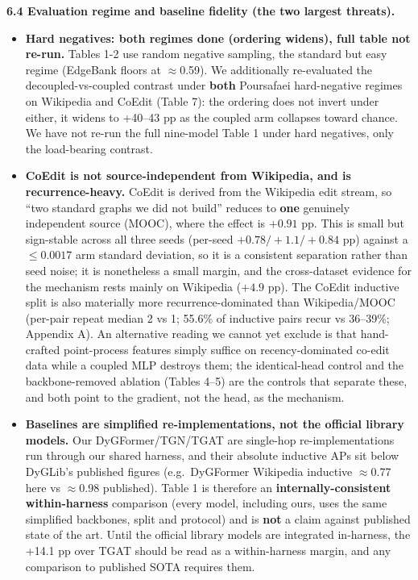 \documentclass[conference]{IEEEtran}
\begin{document}
\textbf{6.4 Evaluation regime and baseline fidelity (the two largest threats).}
\begin{itemize}
\item \textbf{Hard negatives: both regimes done (ordering widens), full table not re-run.} Tables 1-2 use random negative sampling, the standard but easy regime (EdgeBank floors at $\approx$0.59). We additionally re-evaluated the decoupled-vs-coupled contrast under \textbf{both} Poursafaei hard-negative regimes on Wikipedia and CoEdit (Table 7): the ordering does not invert under either, it widens to +40--43 pp as the coupled arm collapses toward chance. We have not re-run the full nine-model Table 1 under hard negatives, only the load-bearing contrast.
\item \textbf{CoEdit is not source-independent from Wikipedia, and is recurrence-heavy.} CoEdit is derived from the Wikipedia edit stream, so ``two standard graphs we did not build'' reduces to \textbf{one} genuinely independent source (MOOC), where the effect is $+0.91$ pp. This is small but sign-stable across all three seeds (per-seed $+0.78/+1.1/+0.84$ pp) against a $\le 0.0017$ arm standard deviation, so it is a consistent separation rather than seed noise; it is nonetheless a small margin, and the cross-dataset evidence for the mechanism rests mainly on Wikipedia ($+4.9$ pp). The CoEdit inductive split is also materially more recurrence-dominated than Wikipedia/MOOC (per-pair repeat median 2 vs 1; 55.6\% of inductive pairs recur vs 36--39\%; Appendix A). An alternative reading we cannot yet exclude is that hand-crafted point-process features simply suffice on recency-dominated co-edit data while a coupled MLP destroys them; the identical-head control and the backbone-removed ablation (Tables 4--5) are the controls that separate these, and both point to the gradient, not the head, as the mechanism.
\item \textbf{Baselines are simplified re-implementations, not the official library models.} Our DyGFormer/TGN/TGAT are single-hop re-implementations run through our shared harness, and their absolute inductive APs sit below DyGLib's published figures (e.g.~DyGFormer Wikipedia inductive $\approx$0.77 here vs $\approx$0.98 published). Table 1 is therefore an \textbf{internally-consistent within-harness} comparison (every model, including ours, uses the same simplified backbones, split and protocol) and is \textbf{not} a claim against published state of the art. Until the official library models are integrated in-harness, the +14.1 pp over TGAT should be read as a within-harness margin, and any comparison to published SOTA requires them.
\end{itemize}
\end{document}
